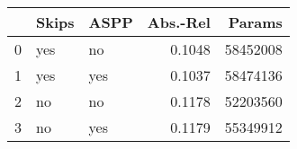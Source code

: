 \begin{tabular}{lllrr}
\toprule
{} & Skips & ASPP &  Abs.-Rel &    Params \\
\midrule
0 &   yes &   no &    0.1048 &  58452008 \\
1 &   yes &  yes &    0.1037 &  58474136 \\
2 &    no &   no &    0.1178 &  52203560 \\
3 &    no &  yes &    0.1179 &  55349912 \\
\bottomrule
\end{tabular}
